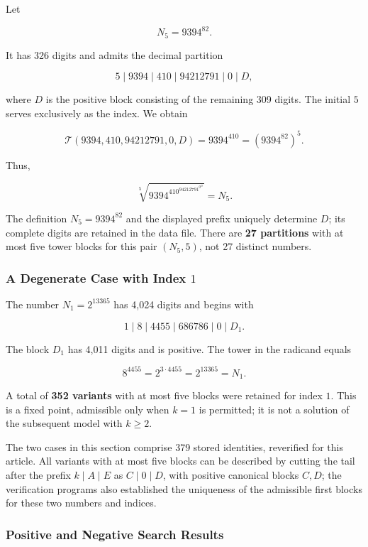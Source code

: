 \documentclass[11pt,a4paper]{article}
\begin{document}
Let

\[
N_5=9394^{82}.
\]

It has 326 digits and admits the decimal partition

\[
5\mid9394\mid410\mid94212791\mid0\mid D,
\]

where $D$ is the positive block consisting of the remaining 309 digits. The initial $5$ serves exclusively as the index. We obtain

\[
\mathcal T(9394,410,94212791,0,D)
=9394^{410}=(9394^{82})^5.
\]

Thus,

\[
\boxed{\sqrt[5]{9394^{410^{94212791^{0^D}}}}=N_5.}
\]

The definition $N_5=9394^{82}$ and the displayed prefix uniquely determine $D$; its complete digits are retained in the data file. There are \textbf{27 partitions} with at most five tower blocks for this pair $(N_5,5)$, not 27 distinct numbers.

\subsubsection{A Degenerate Case with Index $1$}

The number $N_1=2^{13365}$ has 4,024 digits and begins with

\[
1\mid8\mid4455\mid686786\mid0\mid D_1.
\]

The block $D_1$ has 4,011 digits and is positive. The tower in the radicand equals

\[
8^{4455}=2^{3\cdot4455}=2^{13365}=N_1.
\]

A total of \textbf{352 variants} with at most five blocks were retained for index $1$. This is a fixed point, admissible only when $k=1$ is permitted; it is not a solution of the subsequent model with $k\geq2$.

The two cases in this section comprise 379 stored identities, reverified for this article. All variants with at most five blocks can be described by cutting the tail after the prefix $k\mid A\mid E$ as $C\mid0\mid D$, with positive canonical blocks $C,D$; the verification programs also established the uniqueness of the admissible first blocks for these two numbers and indices.

\subsubsection{Positive and Negative Search Results}
\end{document}
